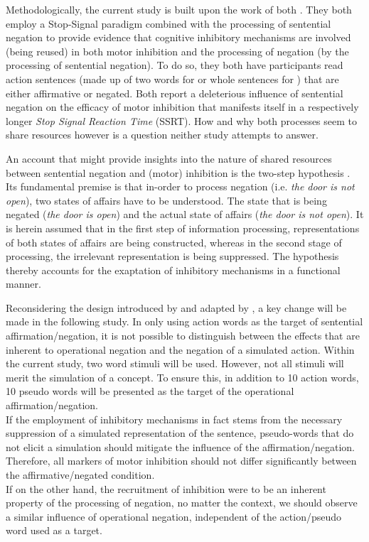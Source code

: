 Methodologically, the current study is built upon the work of both
\textcite{montalti_is_2023, beltran_sentential_2018}.
They both employ a
Stop-Signal paradigm combined with the processing of sentential negation to
provide evidence that cognitive inhibitory mechanisms are involved (being
reused) in both motor inhibition and the processing of negation
(by the processing of sentential negation). To do so,
they both have participants read action sentences (made up of two words
for \citeauthor{montalti_is_2023} or whole sentences
for \citeauthor{beltran_sentential_2018}) that are either affirmative or negated.
Both report a deleterious influence of sentential negation on the efficacy of
motor inhibition that manifests itself in a respectively longer
\textit{Stop Signal Reaction Time} (SSRT). How and why both processes seem to
share resources however is a question neither study attempts to answer.

An account that might provide insights into the nature of shared
resources between sentential negation and (motor) inhibition is
the two-step hypothesis \parencite[][]{kaup_processing_2006, dudschig_how_2018}. Its
fundamental premise is that in-order to process negation (i.e. \textit{the
	door is not open}), two states of affairs have to be understood. The state
that is being negated (\textit{the door is open}) and the actual state of
affairs (\textit{the door is not open}). It is herein assumed that in the first step
of information processing, representations of both states of affairs
are being constructed, whereas in the second stage of processing,
the irrelevant representation is being suppressed. The hypothesis thereby
accounts for the exaptation of inhibitory mechanisms in a functional manner.

Reconsidering the design introduced by \textcite{beltran_sentential_2018} and
adapted by \textcite{montalti_is_2023}, a key change will be made in the
following study. In only using action words as the target of sentential
affirmation/negation, it is not possible to distinguish between the effects
that are inherent to operational negation and the negation of a simulated
action. Within the current study, two word stimuli
\parencite[as in][]{montalti_is_2023} will be used. However, not all stimuli
will merit the simulation of a concept. To ensure this, in addition to 10
action words, 10 pseudo words will be presented as the target of the
operational affirmation/negation.\\
If the employment of inhibitory mechanisms in fact stems from the necessary
suppression of a simulated representation of the sentence, pseudo-words that
do not elicit a simulation should mitigate the influence of the
affirmation/negation. Therefore, all markers of motor inhibition should not
differ significantly between the affirmative/negated condition.\\
If on the other hand, the recruitment of inhibition were to be an inherent property of the
processing of negation, no matter the context, we should observe a similar
influence of operational negation, independent of the action/pseudo word used
as a target.

